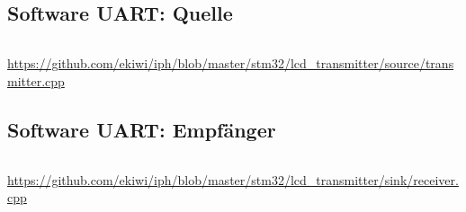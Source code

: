 \documentclass[12pt,a4paper]{article}
\begin{document}
\subsection{Software UART: Quelle}
\inputminted[label=transmitter.cpp,linenos,tabsize=4,fontsize=\normalsize,frame=lines,rulecolor=\color{gray!70},framerule=1pt]{c++}{../stm32/lcd_transmitter/source/transmitter.cpp}
\url{https://github.com/ekiwi/iph/blob/master/stm32/lcd\_transmitter/source/transmitter.cpp}

\subsection{Software UART: Empfänger}
\label{app:uart_receiver}
\inputminted[label=receiver.cpp,linenos,tabsize=4,fontsize=\normalsize,frame=lines,rulecolor=\color{gray!70},framerule=1pt]{c++}{../stm32/lcd_transmitter/sink/receiver.cpp}
\url{https://github.com/ekiwi/iph/blob/master/stm32/lcd\_transmitter/sink/receiver.cpp}
\end{document}
